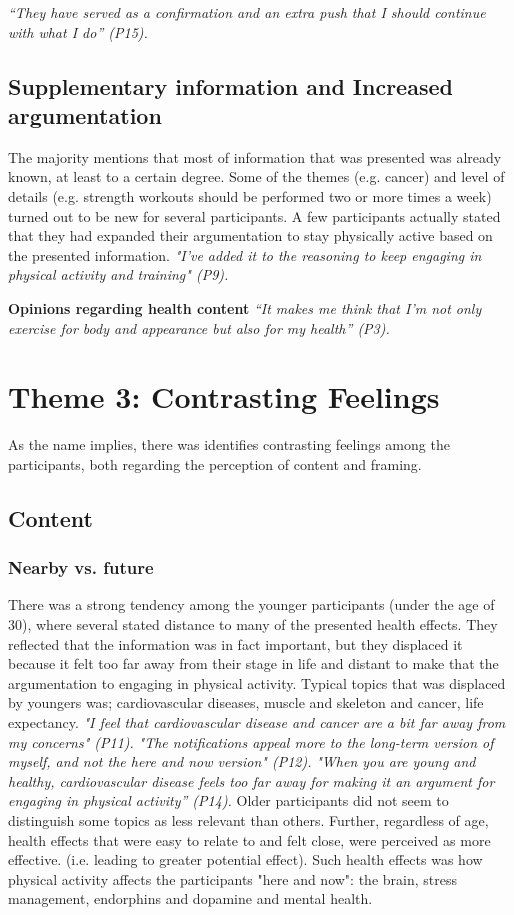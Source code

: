 \textit{“They have served as a confirmation and an extra push that I should continue with what I do” (P15).}

\subsection{Supplementary information and Increased argumentation}
The majority mentions that most of information that was presented was already known, at least to a certain degree. Some of the themes (e.g. cancer) and level of details (e.g. strength workouts should be performed two or more times a week) turned out to be new for several participants. A few participants actually stated that they had expanded their argumentation to stay physically active based on the presented information. 
\textit{"I've added it to the reasoning to keep engaging in physical activity and training" (P9).}

\textbf{Opinions regarding health content} 
\textit{“It makes me think that I'm not only exercise for body and appearance but also for my health” (P3).}

\section{Theme 3: Contrasting Feelings}
As the name implies, there was identifies contrasting feelings among the participants, both regarding the perception of content and framing. 

\subsection{Content}
\subsubsection{Nearby vs. future}
There was a strong tendency among the younger participants (under the age of 30), where several stated distance to many of the presented health effects. They reflected that the information was in fact important, but they displaced it because it felt too far away from their stage in life and distant to make that the argumentation to engaging in physical activity. Typical topics that was displaced by youngers was; cardiovascular diseases, muscle and skeleton and cancer, life expectancy. 
\textit{"I feel that cardiovascular disease and cancer are a bit far away from my concerns" (P11).}
\textit{"The notifications appeal more to the long-term version of myself, and not the here and now version" (P12).}
\textit{"When you are young and healthy, cardiovascular disease feels too far away for making it an argument for engaging in physical activity” (P14).} 
Older participants did not seem to distinguish some topics as less relevant than others. Further, regardless of age, health effects that were easy to relate to and felt close, were perceived as more effective. (i.e. leading to greater potential effect). Such health effects was how physical activity affects the participants "here and now": the brain, stress management, endorphins and dopamine and mental health. 

